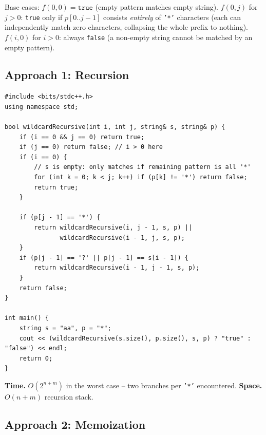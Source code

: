 Base cases: $f(0,0) = \texttt{true}$ (empty pattern matches empty
string). $f(0,j)$ for $j>0$: \texttt{true} only if $p[0..j-1]$ consists
\emph{entirely} of \texttt{'*'} characters (each can independently match
zero characters, collapsing the whole prefix to nothing).
$f(i,0)$ for $i>0$: always \texttt{false} (a non-empty string cannot be
matched by an empty pattern).

\subsection*{Approach 1: Recursion}

\begin{lstlisting}
#include <bits/stdc++.h>
using namespace std;

bool wildcardRecursive(int i, int j, string& s, string& p) {
    if (i == 0 && j == 0) return true;
    if (j == 0) return false; // i > 0 here
    if (i == 0) {
        // s is empty: only matches if remaining pattern is all '*'
        for (int k = 0; k < j; k++) if (p[k] != '*') return false;
        return true;
    }

    if (p[j - 1] == '*') {
        return wildcardRecursive(i, j - 1, s, p) ||
               wildcardRecursive(i - 1, j, s, p);
    }
    if (p[j - 1] == '?' || p[j - 1] == s[i - 1]) {
        return wildcardRecursive(i - 1, j - 1, s, p);
    }
    return false;
}

int main() {
    string s = "aa", p = "*";
    cout << (wildcardRecursive(s.size(), p.size(), s, p) ? "true" : "false") << endl;
    return 0;
}
\end{lstlisting}

\begin{complexitybox}
\textbf{Time.} $O(2^{n+m})$ in the worst case -- two branches per
\texttt{'*'} encountered.
\textbf{Space.} $O(n+m)$ recursion stack.
\end{complexitybox}

\subsection*{Approach 2: Memoization}

